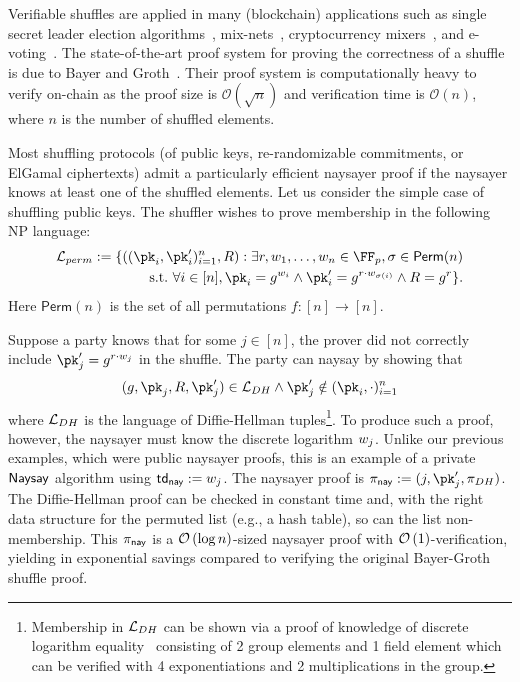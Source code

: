 Verifiable shuffles are applied in many (blockchain) applications such as single secret leader election algorithms~\cite{AFT:Boneh20}, mix-nets~\cite{CACM:Chaum81}, cryptocurrency mixers~\cite{EPRINT:SNBB19}, and e-voting~\cite{USENIX:Adida08}. The state-of-the-art proof system for proving the correctness of a shuffle is due to Bayer and Groth~\cite{EC:BayGro12}. Their proof system is computationally heavy to verify on-chain as the proof size is $\mathcal{O}(\sqrt{n})$ and verification time is $\mathcal{O}(n)$, where $n$ is the number of shuffled elements. 

Most shuffling protocols (of public keys, re-randomizable commitments, or ElGamal ciphertexts) admit a particularly efficient naysayer proof if the naysayer knows at least one of the shuffled elements. Let us consider the simple case of shuffling public keys. The shuffler wishes to prove membership in the following  NP language:
\begin{align*}%
    \Lang_{perm}:= \{ ((\pk_i,\pk_i')_{i=1}^n,R) : \exists r,\witness_1,\dots,\witness_n \in \FF_p, \sigma \in\mathsf{Perm}(n) \\
    \suchthat \forall i\in[n], \pk_i = g^{\witness_i} \land \pk_i' = g^{r \cdot \witness_{\sigma(i)}} \land R = g^r
    \}.
\end{align*}
Here $\mathsf{Perm}(n)$ is the set of all permutations $f:[n]\rightarrow[n]$.

Suppose a party knows that for some $j\in[n]$, the prover did not correctly include $\pk_j' = g^{r\cdot \witness_j}$ in the shuffle. The party can naysay by showing that 
\[
    (g,\pk_j,R,\pk_j')\in\Lang_{DH}\land \pk_j' \notin (\pk_i,\cdot)_{i=1}^n
\]
where $\mathcal{L}_{DH}$ is the language of Diffie-Hellman tuples\footnote{Membership in $\mathcal{L}_{DH}$ can be shown via a proof of knowledge of discrete logarithm equality~\cite{C:ChaPed92} consisting of 2 group elements and 1 field element which can be verified with 4 exponentiations and 2 multiplications in the group.}. To produce such a proof, however, the naysayer must know the discrete logarithm $w_j$. Unlike our previous examples, which were public naysayer proofs, this is an example of a private $\mathsf{Naysay}$ algorithm using $\mathsf{td}_{\mathsf{nay}} := w_j$. The naysayer proof is $\pi_\nay := (j, \pk_j', \pi_{DH})$. The Diffie-Hellman proof can be checked in constant time and, with the right data structure for the permuted list (e.g., a hash table), so can the list non-membership. This $\pi_{\mathsf{nay}}$ is a $\mathcal{O}\left(\log{n}\right)$-sized naysayer proof with $\mathcal{O}\left(1\right)$-verification, yielding in exponential savings compared to verifying the original Bayer-Groth shuffle proof.

